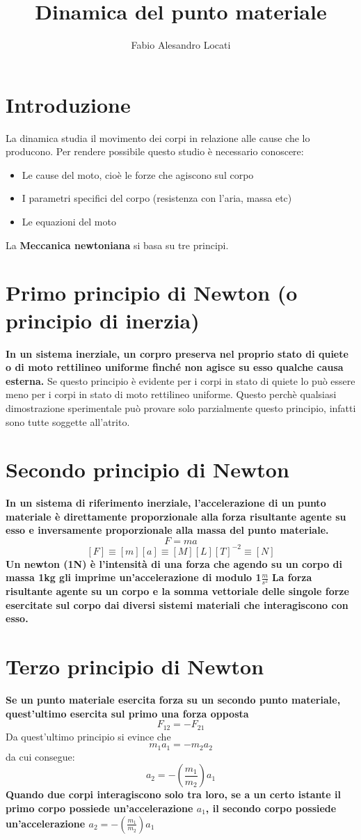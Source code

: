 \documentclass[a4paper,10pt]{article}
\title{Dinamica del punto materiale}
\author{Fabio Alesandro Locati}
\begin{document}
\maketitle

\section{Introduzione}
La dinamica studia il movimento dei corpi in relazione alle cause che lo producono. Per rendere possibile questo studio è necessario conoscere:
\begin{itemize}
 \item Le cause del moto, cioè le forze che agiscono sul corpo
 \item I parametri specifici del corpo (resistenza con l'aria, massa etc)
 \item Le equazioni del moto
\end{itemize}
La \textbf{Meccanica newtoniana} si basa su tre principi.

\section{Primo principio di Newton (o principio di inerzia)}
\textbf{In un sistema inerziale, un corpro preserva nel proprio stato di quiete o di moto rettilineo uniforme finché non agisce su esso qualche causa esterna.}
Se questo principio è evidente per i corpi in stato di quiete lo può essere meno per i corpi in stato di moto rettilineo uniforme. Questo perchè qualsiasi dimostrazione sperimentale può provare solo parzialmente questo principio, infatti sono tutte soggette all'atrito.

\section{Secondo principio di Newton}
\textbf{In un sistema di riferimento inerziale, l'accelerazione di un punto materiale è direttamente proporzionale alla forza risultante agente su esso e inversamente proporzionale alla massa del punto materiale.}
\[F=ma\]
\[[F]\equiv[m][a]\equiv[M][L][T]^{-2}\equiv[N]\]
\textbf{Un newton (1N) è l'intensità di una forza che agendo su un corpo di massa 1kg gli imprime un'accelerazione di modulo 1$\frac{m}{s^2}$}
\textbf{La forza risultante agente su un corpo e la somma vettoriale delle singole forze esercitate sul corpo dai diversi sistemi materiali che interagiscono con esso.}

\section{Terzo principio di Newton}
\textbf{Se un punto materiale esercita forza su un secondo punto materiale, quest'ultimo esercita sul primo una forza opposta}
\[F_{12}=-F_{21}\]
Da quest'ultimo principio si evince che
\[m_1a_1 = -m_2a_2\]
da cui consegue:
\[a_2=-(\frac{m_1}{m_2})a_1\]
\textbf{Quando due corpi interagiscono solo tra loro, se a un certo istante il primo corpo possiede un'accelerazione $a_1$, il secondo corpo possiede un'accelerazione $a_2=-(\frac{m_1}{m_2})a_1$}
\end{document}
